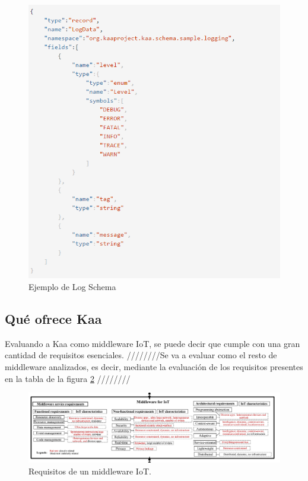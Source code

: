 \documentclass[12pt, twoside]{book}
\begin{document}
\begin{figure}[H]
\centering
\includegraphics[scale=0.5]{images/log_schema_example}
\caption{Ejemplo de Log Schema}\label{L504}
\end{figure} 
\subsection{Qué ofrece Kaa}
Evaluando a Kaa como middleware IoT, se puede decir que cumple con una gran cantidad de requisitos esenciales. ////////Se va a evaluar como el resto de middleware analizados, es decir, mediante la evaluación de los requisitos presentes en la tabla de la figura \ref{L505} ////////
\begin{figure}[H]
\centering
\includegraphics[scale=0.5]{images/requisitos}
\caption{Requisitos de un middleware IoT.}\label{L505}
\end{figure} 
\end{document}
